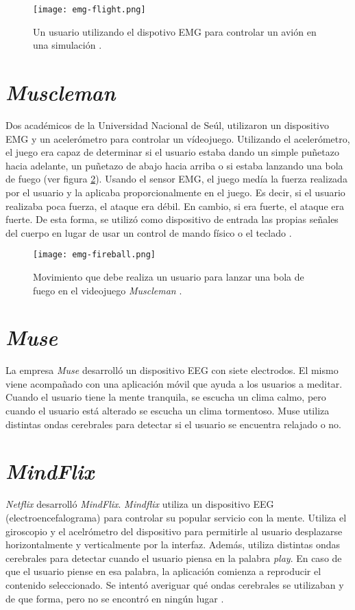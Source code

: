 \begin{figure}[H]
	\centering
    \texttt{[image: emg-flight.png]}
    \caption{Un usuario utilizando el dispotivo EMG para controlar un avión en una simulación  \cite{emg-flight}.}
	\label{fig:emg-flight}
\end{figure}

\section{\emph{Muscleman}}

Dos académicos de la Universidad Nacional de Seúl, utilizaron un dispositivo EMG y un acelerómetro para controlar un vídeojuego. Utilizando el acelerómetro, el juego era capaz de determinar si el usuario estaba dando un simple puñetazo hacia adelante, un puñetazo de abajo hacia arriba o si estaba lanzando una bola de fuego (ver 
figura \ref{fig:fireball}). Usando el sensor EMG, el juego medía la fuerza realizada por el usuario y la aplicaba proporcionalmente en el juego. Es decir, si el usuario realizaba poca fuerza, el ataque era débil. En cambio, si era fuerte, el ataque era fuerte. De esta forma, se utilizó como dispositivo de entrada las propias señales del cuerpo en lugar de usar un control de mando físico o el teclado \cite{emg-fireball}.

\begin{figure}[H]
    \texttt{[image: emg-fireball.png]}
    \caption{Movimiento que debe realiza un usuario para lanzar una bola de fuego en el videojuego \emph{Muscleman} \cite{emg-fireball}.}
	\label{fig:fireball}
\end{figure}

\section{\emph{Muse}}

La empresa \emph{Muse} desarrolló un dispositivo EEG con siete electrodos. El mismo viene acompañado con una aplicación móvil que ayuda a los usuarios a meditar. Cuando el usuario tiene la mente tranquila, se escucha un clima calmo, pero cuando el usuario está alterado se escucha un clima tormentoso. Muse utiliza distintas ondas cerebrales para detectar si el usuario se encuentra relajado o no.

\section{\emph{MindFlix}}

\emph{Netflix} desarrolló \emph{MindFlix}. \emph{Mindflix} utiliza un dispositivo EEG (electroencefalograma) para controlar su popular servicio con la mente. Utiliza el giroscopio y el acelrómetro del dispositivo para permitirle al usuario desplazarse horizontalmente y verticalmente por la interfaz. Además, utiliza distintas ondas cerebrales para detectar cuando el usuario piensa en la palabra \emph{play}. En caso de que el usuario piense en esa palabra,  la aplicación comienza a reproducir el contenido seleccionado. Se intentó averiguar qué ondas cerebrales se utilizaban y de que forma, pero no se encontró en ningún lugar \cite{mindflix}.

